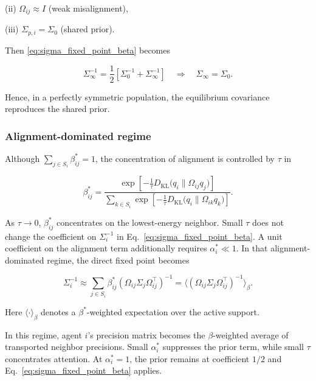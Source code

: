 \documentclass[twoside,11pt]{article}
\begin{document}
(ii) $\Omega_{ij} \approx I$ (weak misalignment),

(iii) $\Sigma_{p,i} = \Sigma_0$ (shared prior).

Then \eqref{eq:sigma_fixed_point_beta} becomes

\begin{equation}
\Sigma_\infty^{-1}
=\frac{1}{2}
\left[
\Sigma_0^{-1}
+ \Sigma_\infty^{-1}
\right]
\quad\Longrightarrow\quad
\Sigma_\infty = \Sigma_0.
\end{equation}

Hence, in a perfectly symmetric population, the equilibrium covariance reproduces the shared prior.

\subsubsection{Alignment-dominated regime}

Although $\sum_{j\in S_i}\beta_{ij}^*=1$, the concentration of alignment is controlled by $\tau$ in

\begin{equation}
\beta_{ij}^*
=\frac{
\exp \left[
-\frac{1}{\tau}
D_{\mathrm{KL}} \big(q_i \| \Omega_{ij} q_j\big)
\right]
}{\sum_{k\in S_i}
\exp \left[
-\frac{1}{\tau}
D_{\mathrm{KL}} \big(q_i \| \Omega_{ik} q_k\big)
\right]}.
\end{equation}

As $\tau\to0$, $\beta_{ij}^*$ concentrates on the lowest-energy neighbor. Small $\tau$ does not change the coefficient on $\Sigma_i^{-1}$ in Eq.~\eqref{eq:sigma_fixed_point_beta}. A unit coefficient on the alignment term additionally requires $\alpha_i^*\ll1$. In that alignment-dominated regime, the direct fixed point becomes

\begin{equation}
\boxed{
\Sigma_i^{-1}
 \approx 
\sum_{j\in S_i} \beta_{ij}^*
(\Omega_{ij}\Sigma_j\Omega_{ij}^\top)^{-1}
 = \big\langle(\Omega_{ij}\Sigma_j\Omega_{ij}^\top)^{-1}
\big\rangle_{\beta}.}
\label{eq:beta_weighted_precision}
\end{equation}

Here $\langle\cdot\rangle_\beta$ denotes a $\beta^*$-weighted expectation over the active support.

In this regime, agent $i$'s precision matrix becomes the $\beta$-weighted average of transported neighbor precisions. Small $\alpha_i^*$ suppresses the prior term, while small $\tau$ concentrates attention. At $\alpha_i^*=1$, the prior remains at coefficient $1/2$ and Eq.~\eqref{eq:sigma_fixed_point_beta} applies.
\end{document}
